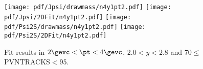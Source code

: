 \begin{figure}[H]
\begin{center}
\texttt{[image: pdf/Jpsi/drawmass/n4y1pt2.pdf]}
\texttt{[image: pdf/Jpsi/2DFit/n4y1pt2.pdf]}
\vspace*{-0.5cm}
\texttt{[image: pdf/Psi2S/drawmass/n4y1pt2.pdf]}
\texttt{[image: pdf/Psi2S/2DFit/n4y1pt2.pdf]}
\vspace*{-0.5cm}
\end{center}
\caption{Fit results in $2\gevc<\pt<4\gevc$, $2.0<y<2.8$ and 70$\leq$PVNTRACKS$<$95.}
\label{Fitn4y1pt2}
\end{figure}
